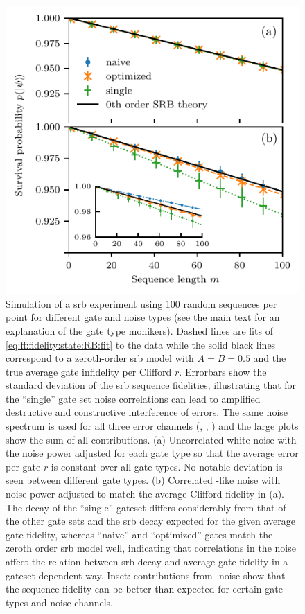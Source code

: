 \begin{figure}[tbp]
    \centering
    \includegraphics{img/pdf/RB_naive-optimized-single_gates_white_vs_correl_with_Z_noise_inset}
    \caption{
        Simulation of a \gls{srb} experiment using \num{100} random sequences per point for different gate and noise types (see the main text for an explanation of the gate type monikers).
        Dashed lines are fits of \cref{eq:ff:fidelity:state:RB:fit} to the data while the solid black lines correspond to a zeroth-order \gls{srb} model with $A=B=\num{0.5}$ and the true average gate infidelity per Clifford $r$.
        Errorbars show the standard deviation of the \gls{srb} sequence fidelities, illustrating that for the \enquote{single} gate set noise correlations can lead to amplified destructive and constructive interference of errors.
        The same noise spectrum is used for all three error channels (\px, \py, \pz) and the large plots show the sum of all contributions.
        (a) Uncorrelated white noise with the noise power adjusted for each gate type so that the average error per gate $r$ is constant over all gate types.
        No notable deviation is seen between different gate types.
        (b) Correlated \oneoverf-like noise with noise power adjusted to match the average Clifford fidelity in (a).
        The decay of the \enquote{single} gateset differs considerably from that of the other gate sets and the \gls{srb} decay expected for the given average gate fidelity, whereas \enquote{naive} and \enquote{optimized} gates match the zeroth order \gls{srb} model well, indicating that correlations in the noise affect the relation between \gls{srb} decay and average gate fidelity in a gateset-dependent way.
        Inset: contributions from \pz-noise show that the sequence fidelity can be better than expected for certain gate types and noise channels.
    }
    \label{fig:ff:randomized_benchmarking:noise_comparison}
\end{figure}

